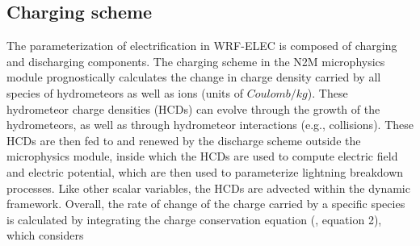 \subsection{Charging scheme}
\label{sec:n2m_charge}
The parameterization of electrification in WRF-ELEC is composed of charging and discharging components. The charging scheme in the N2M microphysics module prognostically calculates the change in charge density carried by all species of hydrometeors as well as ions (units of $Coulomb/kg$). These hydrometeor charge densities (HCDs) can evolve through the growth of the hydrometeors, as well as through hydrometeor interactions (e.g., collisions). These HCDs are then fed to and renewed by the discharge scheme outside the microphysics module, inside which the HCDs are used to compute electric field and electric potential, which are then used to parameterize lightning breakdown processes. Like other scalar variables, the HCDs are advected within the dynamic framework. Overall, the rate of change of the charge carried by a specific species is calculated by integrating the charge conservation equation (\cite{mansell2005charge}, equation 2), which considers

